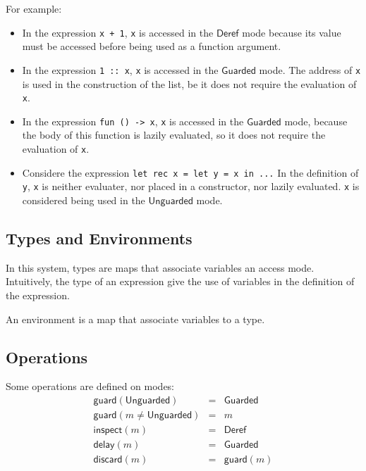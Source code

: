 \documentclass{article}
\newcommand{\Deref}{\mathsf{Deref}}
\newcommand{\Unguarded}{\mathsf{Unguarded}}
\newcommand{\Guarded}{\mathsf{Guarded}}
\newcommand{\inspect}{\mathsf{inspect}}
\newcommand{\guard}{\mathsf{guard}}
\newcommand{\discard}{\mathsf{discard}}
\newcommand{\delay}{\mathsf{delay}}
\begin{document}
For example:
\begin{itemize}
  \item In the expression \lstinline|x + 1|, \lstinline|x| is accessed in the
    $\Deref$ mode because its value must be accessed before being used as
    a function argument.
  \item In the expression \lstinline|1 :: x|, \lstinline|x| is accessed in the
    $\Guarded$ mode. The address of \lstinline|x| is used in the
    construction of the list, be it does not require the evaluation of
    \lstinline|x|.
  \item In the expression \lstinline|fun () -> x|, \lstinline|x| is accessed in
    the $\Guarded$ mode, because the body of this function is lazily
    evaluated, so it does not require the evaluation of \lstinline|x|.
  \item Considere the expression \lstinline |let rec x = let y = x in ...|
    In the definition of \lstinline|y|, \lstinline|x| is neither evaluater, nor
    placed in a constructor, nor lazily evaluated. \lstinline|x| is considered
    being used in the $\Unguarded$ mode.
\end{itemize}

\subsection{Types and Environments}
In this system, types are maps that associate variables an access mode.
Intuitively, the type of an expression give the use of variables in the
definition of the expression.

An environment is a map that associate variables to a type.

\subsection{Operations}
Some operations are defined on modes:
\begin{displaymath}
  \begin{array}{lll}
    \guard(\Unguarded)              & = & \Guarded \\
    \guard(m \neq \Unguarded)       & = & m        \\
    \inspect(m)                     & = & \Deref   \\
    \delay(m)                       & = & \Guarded \\
    \discard(m)                     & = & \guard(m)
  \end{array}
\end{displaymath}
\end{document}
